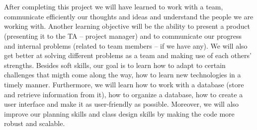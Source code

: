 \\\\
After completing this project we will have learned to work with a team, communicate efficiently our thoughts and ideas and understand the people we are working with. Another learning objective will be the ability to present a product  (presenting it to the TA – project manager) and to communicate our progress and internal problems (related to team members – if we have any). We will also get better at solving different problems as a team and making use of each others’ strengths. Besides soft skills, our goal is to learn how to adapt to certain challenges that migth come along the way, how to learn new technologies in a timely manner. Furthermore, we will learn how to work with a database (store and retrieve information from it), how to organize a database, how to create a user interface and make it as user-friendly as possible. Moreover, we will also improve our planning skills and class design skills by making the code more robust and scalable.
